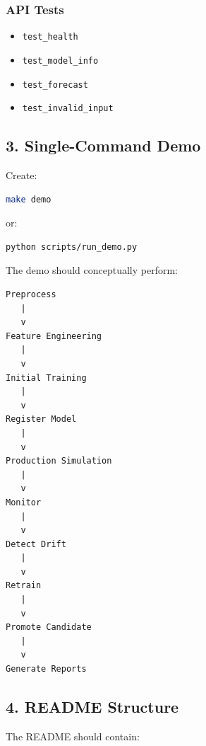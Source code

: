 \documentclass[11pt,a4paper]{article}
\begin{document}
\subsubsection{API Tests}

\begin{itemize}
    \item \texttt{test\_health}
    \item \texttt{test\_model\_info}
    \item \texttt{test\_forecast}
    \item \texttt{test\_invalid\_input}
\end{itemize}

\subsection{3. Single-Command Demo}

Create:

\begin{lstlisting}[language=bash]
make demo
\end{lstlisting}

or:

\begin{lstlisting}[language=bash]
python scripts/run_demo.py
\end{lstlisting}

The demo should conceptually perform:

\begin{verbatim}
Preprocess
   |
   v
Feature Engineering
   |
   v
Initial Training
   |
   v
Register Model
   |
   v
Production Simulation
   |
   v
Monitor
   |
   v
Detect Drift
   |
   v
Retrain
   |
   v
Promote Candidate
   |
   v
Generate Reports
\end{verbatim}

\subsection{4. README Structure}

The README should contain:
\end{document}
